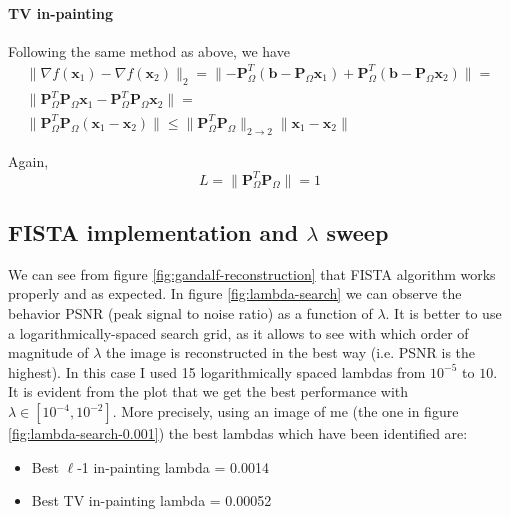 \documentclass[12pt]{article}
\begin{document}
\paragraph{TV in-painting}
Following the same method as above, we have
\begin{gather}
     \rVert \nabla f(\mathbf{x}_1) - \nabla f(\mathbf{x}_2) \rVert_2 = \lVert - \mathbf{P}_{\Omega}^T(\mathbf{b} - \mathbf{P}_{\Omega} \mathbf{x}_1) + \mathbf{P}_{\Omega}^T(\mathbf{b} - \mathbf{P}_{\Omega} \mathbf{x}_2) \rVert = \\
     \lVert \mathbf{P}_{\Omega}^T\mathbf{P}_{\Omega} \mathbf{x}_1 - \mathbf{P}_{\Omega}^T\mathbf{P}_{\Omega} \mathbf{x}_2 \rVert = \\
     \lVert \mathbf{P}_{\Omega}^T\mathbf{P}_{\Omega} (\mathbf{x}_1 - \mathbf{x}_2) \rVert \leq
      \lVert \mathbf{P}_{\Omega}^T\mathbf{P}_{\Omega} \rVert_{2\rightarrow2} \lVert \mathbf{x}_1 - \mathbf{x}_2 \rVert
\end{gather}

Again,
\begin{equation}
    L = \lVert \mathbf{P}_{\Omega}^T \mathbf{P}_{\Omega} \rVert = 1
\end{equation}

\subsection{FISTA implementation and \texorpdfstring{$\lambda$}{Lg} sweep}
We can see from figure \ref{fig:gandalf-reconstruction} that FISTA algorithm works properly and as expected. In figure \ref{fig:lambda-search} we can observe the behavior PSNR (peak signal to noise ratio) as a function of $\lambda$. It is better to use a logarithmically-spaced search grid, as it allows to see with which order of magnitude of $\lambda$ the image is reconstructed in the best way (i.e. PSNR is the highest). In this case I used 15 logarithmically spaced lambdas from $10^{-5}$ to $10$. It is evident from the plot that we get the best performance with $\lambda \in [10^{-4}, 10^{-2}]$. More precisely, using an image of me (the one in figure \ref{fig:lambda-search-0.001}) the best lambdas which have been identified are:

\begin{itemize}
    \item Best $\ell$-1 in-painting lambda = 0.0014
    \item Best TV in-painting lambda = 0.00052
\end{itemize}
\end{document}
